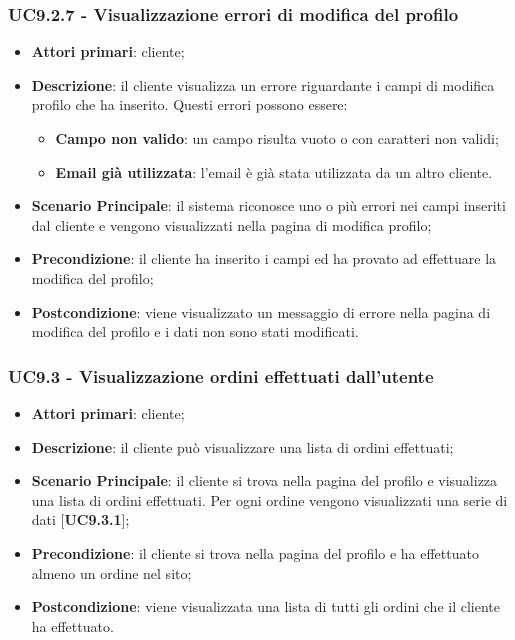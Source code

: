 \subsubsection{UC9.2.7 - Visualizzazione errori di modifica del profilo}
\begin{itemize}
\item \textbf{Attori primari}: cliente;
\item \textbf{Descrizione}: il cliente visualizza un errore riguardante i campi di modifica profilo che ha inserito. Questi errori possono essere:
\begin{itemize}
\item \textbf{Campo non valido}: un campo risulta vuoto o con caratteri non validi;
\item \textbf{Email già utilizzata}: l'email è già stata utilizzata da un altro cliente.
\end{itemize}
\item \textbf{Scenario Principale}: il sistema riconosce uno o più errori nei campi inseriti dal cliente e vengono visualizzati nella pagina di modifica profilo;
\item \textbf{Precondizione}: il cliente ha inserito i campi ed ha provato ad effettuare la modifica del profilo;
\item \textbf{Postcondizione}: viene visualizzato un messaggio di errore nella pagina di modifica del profilo e i dati non sono stati modificati.
\end{itemize}

\subsubsection{UC9.3 - Visualizzazione ordini effettuati dall'utente}
\begin{itemize}
\item \textbf{Attori primari}: cliente;
\item \textbf{Descrizione}: il cliente può visualizzare una lista di ordini effettuati;
\item \textbf{Scenario Principale}: il cliente si trova nella pagina del profilo e visualizza una lista di ordini effettuati. Per ogni ordine vengono visualizzati una serie di dati [\textbf{UC9.3.1}];
\item \textbf{Precondizione}: il cliente si trova nella pagina del profilo e ha effettuato almeno un ordine nel sito;
\item \textbf{Postcondizione}: viene visualizzata una lista di tutti gli ordini che il cliente ha effettuato.
\end{itemize}

